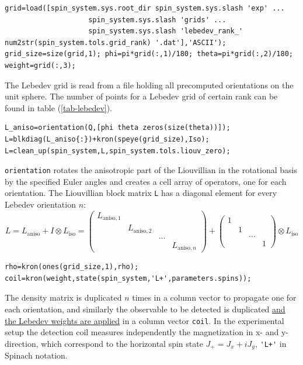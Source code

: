 \documentclass[11.5pt,a4paper]{article}
\begin{document}
\begin{lstlisting}[firstnumber=last]
% Get the spherical averaging grid
grid=load([spin_system.sys.root_dir spin_system.sys.slash 'exp' ...
				    spin_system.sys.slash 'grids' ...
				    spin_system.sys.slash 'lebedev_rank_' num2str(spin_system.tols.grid_rank) '.dat'],'ASCII');
grid_size=size(grid,1); phi=pi*grid(:,1)/180; theta=pi*grid(:,2)/180; weight=grid(:,3);
\end{lstlisting}
The Lebedev grid is read from a file holding all precomputed orientations on the unit sphere. The number of points for a Lebedev grid of certain rank can be found in table (\ref{tab-lebedev}).

\begin{lstlisting}[firstnumber=last]
% Get the orientation array
L_aniso=orientation(Q,[phi theta zeros(size(theta))]);
L=blkdiag(L_aniso{:})+kron(speye(grid_size),Iso);
L=clean_up(spin_system,L,spin_system.tols.liouv_zero);
\end{lstlisting}
\verb$orientation$ rotates the anisotropic part of the Liouvillian in the rotational basis by the specified Euler angles and creates a cell array of operators, one for each orientation. The Liouvillian block matrix \verb$L$ has a diagonal element for every Lebedev orientation $n$:
\begin{equation}
 L= L_{\text{aniso}} + I \otimes L_\text{iso} =
	      \begin{pmatrix} 
		L_{\text{aniso},1} & & & \\
		& L_{\text{aniso},2} & & \\
		& & \text{...} & \\
		& & & L_{\text{aniso},n}
              \end{pmatrix} +
	      \begin{pmatrix} 
		1 & & & \\
		& 1 & & \\
		& & \text{...} & \\
		& & & 1
              \end{pmatrix} \otimes L_\text{iso}
\end{equation}

\begin{lstlisting}[firstnumber=last]
% Get the initial and the detection states
rho=kron(ones(grid_size,1),rho);
coil=kron(weight,state(spin_system,'L+',parameters.spins));
\end{lstlisting}
The density matrix is duplicated $n$ times in a column vector to propagate one for each orientation, and similarly the observable to be detected is duplicated \underline{and the Lebedev weights are applied} in a column vector \verb$coil$. In the experimental setup the detection coil measures independently the magnetization in x- and y-direction, which correspond to the horizontal spin state $J_+ = J_x + i J_y$, \verb$'L+'$ in Spinach notation.
\end{document}
